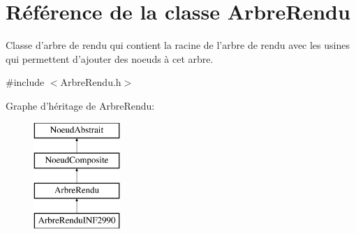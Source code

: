 \hypertarget{class_arbre_rendu}{\section{Référence de la classe Arbre\-Rendu}
\label{class_arbre_rendu}
}


Classe d'arbre de rendu qui contient la racine de l'arbre de rendu avec les usines qui permettent d'ajouter des noeuds à cet arbre.  




{\ttfamily \#include $<$Arbre\-Rendu.\-h$>$}

Graphe d'héritage de Arbre\-Rendu\-:\begin{figure}[H]
\begin{center}
\leavevmode
\includegraphics[height=4.000000cm]{class_arbre_rendu}
\end{center}
\end{figure}
